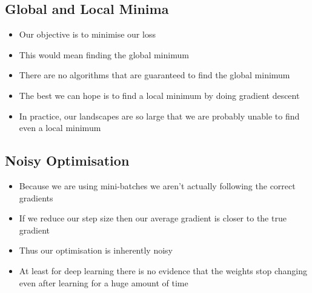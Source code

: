 
\begin{slide}
\section{Global and Local Minima}

\begin{PauseHighLight}
  \begin{itemize}
  \item Our objective is to minimise our loss\pause
  \item This would mean finding the global minimum\pause
  \item There are no algorithms that are guaranteed to find the global
    minimum\pause
  \item The best we can hope is to find a local minimum by doing
    gradient descent\pause
  \item In practice, our landscapes are so large that we are probably
    unable to find even a local minimum\pause
  \end{itemize}
\end{PauseHighLight}

\end{slide}


\begin{slide}
\section{Noisy Optimisation}

\begin{PauseHighLight}
  \begin{itemize}
  \item Because we are using mini-batches we aren't actually following
    the correct gradients\pause
  \item If we reduce our step size then our average gradient is closer
    to the true gradient\pause
  \item Thus our optimisation is inherently noisy\pause
  \item At least for deep learning there is no evidence that the
    weights stop changing even after learning for a huge amount of time\pause
  \end{itemize}
\end{PauseHighLight}

\end{slide}



